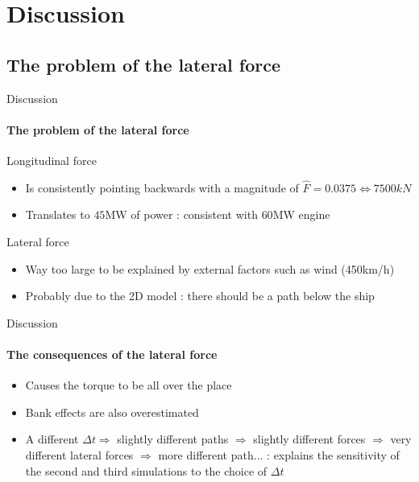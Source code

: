 \documentclass[aspectratio=169]{beamer}
\begin{document}

\section{Discussion}
\subsection{The problem of the lateral force}
\begin{frame}{Discussion}
    \framesubtitle{The problem of the lateral force}
    Longitudinal force
    \begin{itemize}
        \item Is consistently pointing backwards with a magnitude of $\hat{F} = 0.0375 \Leftrightarrow 7500kN$
        \item Translates to $45$MW of power : consistent with $60$MW engine
    \end{itemize}

    \vfill
    Lateral force
    \begin{itemize}
        \item Way too large to be explained by external factors such as wind (450km/h)
        \item Probably due to the 2D model : there should be a path below the ship
    \end{itemize}
\end{frame}


\begin{frame}{Discussion}
    \framesubtitle{The consequences of the lateral force}
    
    \begin{itemize}
        \item Causes the torque to be all over the place
        \item Bank effects are also overestimated 
        \item A different $\Delta t \Longrightarrow$ slightly different paths $\Longrightarrow$ slightly different forces $\Longrightarrow$ very different lateral forces $\Longrightarrow$ more different path... : explains the sensitivity of the second and third simulations to the choice of $\Delta t$
    \end{itemize}
\end{frame}

\end{document}
